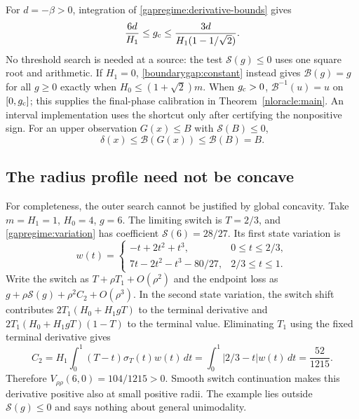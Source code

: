For $d=-\beta>0$, integration of \eqref{gapregime:derivative-bounds} gives
\begin{equation}\label{gapregime:threshold-bracket}
 \frac{6d}{H_1}\le g_{\rm c}
 \le\frac{3d}{H_1(1-1/\sqrt2)}.
\end{equation}
No threshold search is needed at a source: the test
$\mathcal S(g)\le0$ uses one square root and arithmetic.
If $H_1=0$, \eqref{boundarygap:constant} instead gives
$\mathcal B(g)=g$ for all $g\ge0$ exactly when
$H_0\le(1+\sqrt2)m$.
When $g_{\rm c}>0$, $\mathcal B^{-1}(u)=u$ on $[0,g_{\rm c}]$;
this supplies the final-phase calibration in Theorem~\ref{nloracle:main}.
An interval implementation uses the shortcut only after certifying
the nonpositive sign.
For an upper observation $G(x)\le B$ with $\mathcal S(B)\le0$,
\begin{equation}\label{gapregime:inexact}
 \delta(x)\le\mathcal B(G(x))\le\mathcal B(B)=B.
\end{equation}

\subsection{The radius profile need not be concave}
\label{gapregime:nonconcavity}
For completeness, the outer search cannot be justified by global
concavity. Take $m=H_1=1$, $H_0=4$, $g=6$. The limiting switch is
$T=2/3$, and \eqref{gapregime:variation} has coefficient
$\mathcal S(6)=28/27$. Its first state variation is
\[
 w(t)=
 \begin{cases}
 -t+2t^2+t^3,&0\le t\le2/3,\\
 7t-2t^2-t^3-80/27,&2/3\le t\le1.
 \end{cases}
\]
Write the switch as $T+\rho T_1+O(\rho^2)$ and the endpoint loss as
$g+\rho\mathcal S(g)+\rho^2C_2+O(\rho^3)$.
In the second state variation, the switch shift contributes
$2T_1(H_0+H_1gT)$ to the terminal derivative and
$2T_1(H_0+H_1gT)(1-T)$ to the terminal value.
Eliminating $T_1$ using the fixed terminal derivative gives
\[
 C_2=H_1\int_0^1(T-t)\sigma_T(t)w(t)\,dt
     =\int_0^1|2/3-t|w(t)\,dt=\frac{52}{1215}.
\]
Therefore $V_{\rho\rho}(6,0)=104/1215>0$. Smooth switch continuation
makes this derivative positive also at small positive radii.
The example lies outside $\mathcal S(g)\le0$ and says nothing about
general unimodality.
